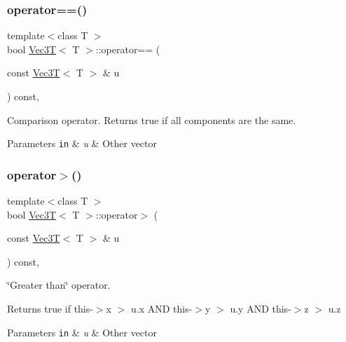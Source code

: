 \subsubsection{\texorpdfstring{operator==()}{operator==()}}
{\footnotesize\ttfamily template$<$class T $>$ \\
bool \hyperlink{classVec3T}{Vec3T}$<$ T $>$\+::operator== (\begin{DoxyParamCaption}\item[{const \hyperlink{classVec3T}{Vec3T}$<$ T $>$ \&}]{u }\end{DoxyParamCaption}) const\hspace{0.3cm}{\ttfamily [inline]}, {\ttfamily [noexcept]}}



Comparison operator. Returns true if all components are the same. 


\begin{DoxyParams}[1]{Parameters}
\mbox{\tt in}  & {\em u} & Other vector \\
\hline
\end{DoxyParams}
\mbox{\label{classVec3T_af99810068907e4935ac38bc397ba1102}} 
\subsubsection{\texorpdfstring{operator$>$()}{operator>()}}
{\footnotesize\ttfamily template$<$class T $>$ \\
bool \hyperlink{classVec3T}{Vec3T}$<$ T $>$\+::operator$>$ (\begin{DoxyParamCaption}\item[{const \hyperlink{classVec3T}{Vec3T}$<$ T $>$ \&}]{u }\end{DoxyParamCaption}) const\hspace{0.3cm}{\ttfamily [inline]}, {\ttfamily [noexcept]}}



\char`\"{}\+Greater than\char`\"{} operator. 

Returns true if this-\/$>$x $>$ u.\+x A\+ND this-\/$>$y $>$ u.\+y A\+ND this-\/$>$z $>$ u.\+z 
\begin{DoxyParams}[1]{Parameters}
\mbox{\tt in}  & {\em u} & Other vector \\
\hline
\end{DoxyParams}
\mbox{\label{classVec3T_a3296f8319642088e08bd2d3e253fcd64}} 
